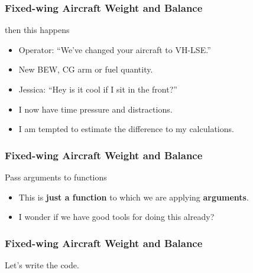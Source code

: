 \begin{frame}
\frametitle{Fixed-wing Aircraft Weight and Balance}
\begin{block}{then this happens}
\begin{itemize}
\item<1-> Operator: ``We've changed your aircraft to VH-LSE.''
\item<2-> New BEW, CG arm or fuel quantity.
\item<3-> Jessica: ``Hey is it cool if I sit in the front?''
\item<4-> I now have time pressure and distractions.
\item<5-> I am tempted to estimate the difference to my calculations.
\end{itemize}
\end{block}
\end{frame}

\begin{frame}
\frametitle{Fixed-wing Aircraft Weight and Balance}
\begin{block}{Pass arguments to functions}
\begin{itemize}
\item<1-> This is \textbf{just a function} to which we are applying \textbf{arguments}.
\item<2-> I wonder if we have good tools for doing this already?
\end{itemize}
\end{block}
\end{frame}

\begin{frame}
\frametitle{Fixed-wing Aircraft Weight and Balance}
\begin{center}
Let's write the code.
\end{center}
\end{frame}

